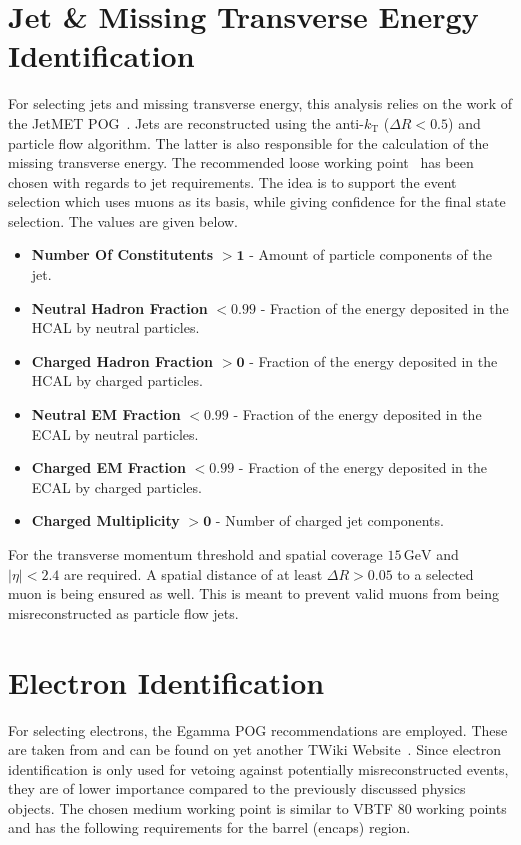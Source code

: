 \section{Jet \& Missing Transverse Energy Identification}
\label{sec:jetid}

For selecting jets and missing transverse energy, this analysis relies on the work of the JetMET POG~\cite{jmepog}. Jets are reconstructed using the anti-$k_{\text{T}}$ ($\Delta R < 0.5$) and particle flow algorithm. The latter is also responsible for the calculation of the missing transverse energy. The recommended loose working point~\cite{jetid, jetidpf} has been chosen with regards to jet requirements. The idea is to support the event selection which uses muons as its basis, while giving confidence for the final state selection. The values are given below.

\begin{itemize}
\item \textbf{Number Of Constitutents} $\mathbf{> 1}$ - Amount of particle components of the jet.
\item \textbf{Neutral Hadron Fraction} $\mathbf{< 0.99}$ - Fraction of the energy deposited in the HCAL by neutral particles.
\item \textbf{Charged Hadron Fraction} $\mathbf{> 0}$ - Fraction of the energy deposited in the HCAL by charged particles.
\item \textbf{Neutral EM Fraction} $\mathbf{< 0.99}$ - Fraction of the energy deposited in the ECAL by neutral particles.
\item \textbf{Charged EM Fraction} $\mathbf{< 0.99}$ - Fraction of the energy deposited in the ECAL by charged particles.
\item \textbf{Charged Multiplicity} $\mathbf{> 0}$ - Number of charged jet components.
\end{itemize}

For the transverse momentum threshold and spatial coverage $15\,\text{GeV}$ and $|\eta|  < 2.4$ are required. A spatial distance of at least $\Delta R > 0.05$ to a selected muon is being ensured as well. This is meant to prevent valid muons from being misreconstructed as particle flow jets. 

\section{Electron Identification}
\label{sec:eleid}

For selecting electrons, the Egamma POG recommendations are employed. These are taken from and can be found on yet another TWiki Website~\cite{egammaid}. Since electron identification is only used for vetoing against potentially misreconstructed events, they are of lower importance compared to the previously discussed physics objects. The chosen medium working point is similar to VBTF 80 working points and has the following requirements for the barrel (encaps) region. 


